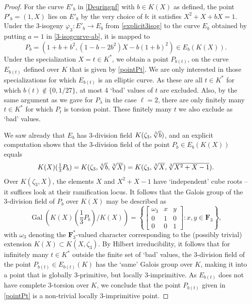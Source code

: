 \documentclass{amsart}
\theoremstyle{plain}
\theoremstyle{definition}
\DeclareMathOperator{\Gal}{Gal}
\newcommand{\FF}{{\mathbf{F}}}
\begin{document}
\begin{proof}
For the curve $E'_b$ in \eqref{Deuringnf} with $b\in K(X)$ as defined, 
the point $P'_b=(1, X)$ lies on $E'_b$ by the very choice of $b$:
it satisfies $X^2+X+bX=1$.
Under the 3-isogeny $\varphi_3: E'_b\to E_b$ from 
\eqref{explicit3isog} to the curve
$E_b$ obtained by putting $a=1$ in \eqref{3-isogcurve-ab},
it is mapped to 
$$
P_b=(1+b+b^2, (1-b-2b^2)X-b(1+b)^2)\in E_b(K(X)).
$$
Under the specialization $X=t\in K^*$, we obtain a point $P_{b(t)}$,
on the curve $E_{b(t)}$ defined over $K$ 
that is given by \eqref{pointPt}.
We are only interested in those 
specializations for which $E_{b(t)}$ is an elliptic curve.
As these are all $t\in K^*$ for which $b(t)\notin \{0, 1/27\}$, at most
4 `bad' values of $t$ are excluded.
Also, by the same argument as we gave for $P_\lambda$ in the case $\ell=2$,
there are only finitely many $t\in K^*$ for which $P_t$ is torsion point. 
These finitely many $t$ we also exclude as `bad' values.

We saw already that $E_b$ has 3-division field 
$K(\zeta_3, \root 3 \of b)$, and an explicit computation 
shows that the 3-division field of the point $P_b\in E_b(K(X))$ equals 
\[
K(X)(\textstyle\frac13 P_b)=K(\zeta_3, \root 3 \of b, \root 3 \of X)=
K(\zeta_3, \root 3 \of X, \root 3 \of {X^2+X-1}).
\]
Over $K(\zeta_3, X)$, the elements $X$ and $X^2+X-1$ have 
`independent' cube roots -- it suffices look at their ramification locus.
It follows that the Galois group of 
the 3-division field of $P_b$ over $K(X)$
may be described as
\[
\Gal(K(X)(\textstyle\frac13 P_b)/K(X))= 
\left\{ \begin{bmatrix}
\omega_3 & x & y \\
0 & 1 & 0 \\
0 & 0 & 1 
\end{bmatrix}: x,y\in\FF_3  \right\},
\]
with $\omega_3$ denoting the $\FF_3^*$-valued character corresponding to
the (possibly trivial) extension $K(X)\subset K(X, \zeta_3)$.
By Hilbert irreducibility, it follows that for infinitely many
$t\in K^*$ outside the finite set of `bad' values, 
the 3-division field of the point $P_{b(t)}\in E_{b(t)}(K)$ 
has the `same' Galois group over $K$,
making it into a point that is globally 3-primitive, but locally $3$-imprimitive.
As $E_{b(t)}$ does not have complete 3-torsion over $K$, we conclude that the point $P_{b(t)}$ given in \eqref{pointPt}
is a non-trivial locally 3-imprimitive point.
\end{proof}
\noindent
\end{document}
